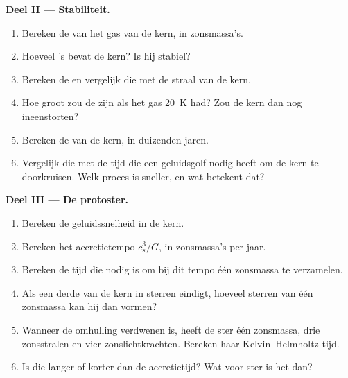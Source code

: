 \begin{problem}
\noindent\textbf{Deel II --- Stabiliteit.}
\begin{enumerate}[resume]
  \item Bereken de  van het gas van de kern, in zonsmassa's.
  \item Hoeveel 's bevat de kern? Is hij stabiel?
  \item Bereken de  en vergelijk die met de straal van de kern.
  \item Hoe groot zou de  zijn als het gas \qty{20}{K} had? Zou de
        kern dan nog ineenstorten?
  \item Bereken de  van de kern, in duizenden jaren.
  \item Vergelijk die met de tijd die een geluidsgolf nodig heeft om de kern te doorkruisen. Welk
        proces is sneller, en wat betekent dat?
\end{enumerate}

\noindent\textbf{Deel III --- De protoster.}
\begin{enumerate}[resume]
  \item Bereken de geluidssnelheid in de kern.
  \item Bereken het accretietempo $c_s^3/G$, in zonsmassa's per jaar.
  \item Bereken de tijd die nodig is om bij dit tempo één zonsmassa te verzamelen.
  \item Als een derde van de kern in sterren eindigt, hoeveel sterren van één zonsmassa
        kan hij dan vormen?
  \item Wanneer de omhulling verdwenen is, heeft de ster één zonsmassa, drie
        zonsstralen en vier zonslichtkrachten. Bereken haar Kelvin--Helmholtz-tijd.
  \item Is die langer of korter dan de accretietijd? Wat voor ster is het
        dan?
\end{enumerate}


\end{problem}
